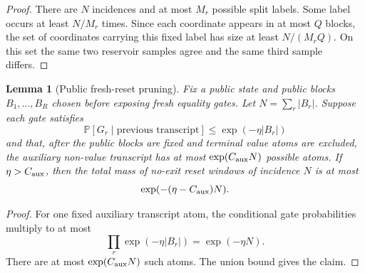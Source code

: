\documentclass[11pt]{article}
\newtheorem{lemma}[theorem]{Lemma}
\newcommand{\Prb}{\mathbb P}
\begin{document}
\begin{proof}
There are $N$ incidences and at most $M_r$ possible split labels.  Some label
occurs at least $N/M_r$ times.  Since each coordinate appears in at most $Q$
blocks, the set of coordinates carrying this fixed label has size at least
$N/(M_rQ)$.  On this set the same two reservoir samples agree and the same
third sample differs.
\end{proof}

\begin{lemma}[Public fresh-reset pruning]
\label{lem:fresh-reset-pruning}
Fix a public state and public blocks $B_1,\ldots,B_R$ chosen before exposing
fresh equality gates.  Let $N=\sum_r |B_r|$.  Suppose each gate satisfies
\[
  \Prb[G_r\mid\text{previous transcript}]\le \exp(-\eta |B_r|)
\]
and that, after the public blocks are fixed and terminal value atoms are
excluded, the auxiliary non-value transcript has at most $\exp(C_{\rm aux}N)$
possible atoms.  If $\eta>C_{\rm aux}$, then the total mass of no-exit reset
windows of incidence $N$ is at most
\[
  \exp(-(\eta-C_{\rm aux})N).
\]
\end{lemma}

\begin{proof}
For one fixed auxiliary transcript atom, the conditional gate probabilities
multiply to at most
\[
  \prod_r \exp(-\eta |B_r|)=\exp(-\eta N).
\]
There are at most $\exp(C_{\rm aux}N)$ such atoms.  The union bound gives the
claim.
\end{proof}
\end{document}
